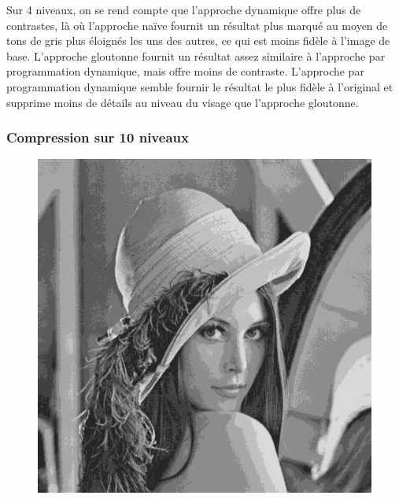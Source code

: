 \documentclass[a4paper, 12pt]{article}
\begin{document}
    Sur 4 niveaux, on se rend compte que l'approche dynamique offre plus de contrastes, là où l'approche naïve fournit un résultat plus marqué au moyen de tons de gris plus éloignés les uns des autres, ce qui est moins fidèle à l'image de base. L'approche gloutonne fournit un résultat assez similaire à l'approche par programmation dynamique, mais offre moins de contraste. L'approche par programmation dynamique semble fournir le résultat le plus fidèle à l'original et supprime moins de détails au niveau du visage que l'approche gloutonne.
    
    \subsubsection{Compression sur 10 niveaux}
	\begin{figure}[ht!]
	    \centering
    	\begin{minipage}[b]{0.3\linewidth}
    	    \includegraphics[scale=0.3]{resources/png/naive10.png}
        \end{minipage}\hfill
        \begin{minipage}[b]{0.3\linewidth}

\end{minipage}
\end{figure}
\end{document}
